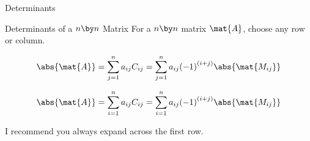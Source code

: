 \documentclass{beamer}
\begin{document}
\begin{frame}{Determinants}
\begin{block}{Determinants of a $n \by n$ Matrix}
For a $n \by n$ matrix $\mat{A}$, choose any row or column.
\begin{description}
\item<2->[\textbf{Expansion by the $\boldsymbol{i}$th row:}]
\begin{equation*}
\abs{\mat{A}} = \sum_{j=1}^{n} a_{ij}C_{ij}
              = \sum_{j=1}^{n} a_{ij}{(-1)}^{(i+j)}\abs{\mat{M_{ij}}}
\end{equation*}
\item<3->[\textbf{Expansion by the $\boldsymbol{j}$th column:}]
\begin{equation*}
\abs{\mat{A}} = \sum_{i=1}^{n} a_{ij}C_{ij}
              = \sum_{i=1}^{n} a_{ij}{(-1)}^{(i+j)}\abs{\mat{M_{ij}}}
\end{equation*}
\end{description}
I recommend you always expand across the first row.
\end{block}
\end{frame}
\end{document}
